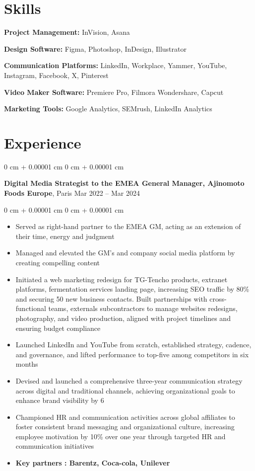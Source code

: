 \documentclass[10pt, letterpaper]{article}
\newenvironment{highlights}{
    \begin{itemize}[
        topsep=0.10 cm,
        parsep=0.10 cm,
        partopsep=0pt,
        itemsep=0pt,
        leftmargin=0 cm + 10pt
    ]
}{
    \end{itemize}
} %
\newenvironment{onecolentry}{
    \begin{adjustwidth}{
        0 cm + 0.00001 cm
    }{
        0 cm + 0.00001 cm
    }
}{
    \end{adjustwidth}
} %
\newenvironment{twocolentry}[2][]{
    \onecolentry
    \def\secondColumn{#2}
    \setcolumnwidth{\fill, 3.5 cm}
    \begin{paracol}{2}
}{
    \switchcolumn \raggedleft \secondColumn
    \end{paracol}
    \endonecolentry
} %
\begin{document}
    
    \section{Skills}
        \textbf{Project Management:} InVision, Asana

        \textbf{Design Software:} Figma, Photoshop, InDesign, Illustrator

        \textbf{Communication Platforms:} LinkedIn, Workplace, Yammer, YouTube, Instagram, Facebook, X, Pinterest

        \textbf{Video Maker Software:} Premiere Pro, Filmora Wondershare, Capcut

        \textbf{Marketing Tools:} Google Analytics, SEMrush, LinkedIn Analytics
    
    \section{Experience}

        \begin{twocolentry}{
            Mar 2022 – Mar 2024
        }
            \textbf{Digital Media Strategist to the EMEA General Manager, Ajinomoto Foods Europe}, Paris\end{twocolentry}

        \vspace{0.10 cm}
        \begin{onecolentry}
            \begin{highlights}
                \item Served as right-hand partner to the EMEA GM, acting as an extension of their time, energy and judgment
                \item Managed and elevated the GM’s and company social media platform by creating compelling content
                \item Initiated a web marketing redesign for TG-Tencho products, extranet platforms, fermentation services landing page, increasing SEO traffic by 80\% and securing 50 new business contacts. Built partnerships with cross-functional teams, externals subcontractors to manage websites redesigns, photography, and video production,
aligned with project timelines and ensuring budget compliance
\item Launched LinkedIn and YouTube from scratch, established strategy, cadence, and governance, and lifted
performance to top-five among competitors in six months
\item Devised and launched a comprehensive three-year communication strategy across digital and traditional
channels, achieving organizational goals to enhance brand visibility by 6%
\item Championed HR and communication activities across global affiliates to foster consistent brand messaging and
organizational culture, increasing employee motivation by 10\% over one year through targeted HR and
communication initiatives

\item \textbf{Key partners : Barentz, Coca-cola, Unilever}
      
            \end{highlights}
        \end{onecolentry}
\end{document}
